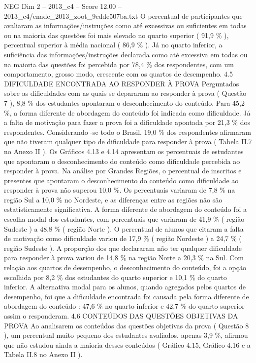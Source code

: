 \begin{textsample}{NEG Dim 2 – 2013\_c4 – Score 12.00 – 2013\_c4/enade\_2013\_zoot\_9cdde507ba.txt}
O percentual de participantes que avaliaram as informações/instruções como até excessivas ou suficientes em todas ou na maioria das questões foi mais elevado no quarto superior ( 91,9 \% ), percentual superior à média nacional ( 86,9 \% ).
Já no quarto inferior, a suficiência das informações/instruções declarada como até excessiva em todas ou na maioria das questões foi percebida por 78,4 \% dos respondentes, com um comportamento, grosso modo, crescente com os quartos de desempenho. 4.5 DIFICULDADE ENCONTRADA AO RESPONDER À PROVA Perguntados sobre as dificuldades com as quais se depararam ao responder à prova ( Questão 7 ), 8,8 \% dos estudantes apontaram o desconhecimento do conteúdo.
Para 45,2 \%, a forma diferente de abordagem do conteúdo foi indicada como dificuldade.
Já a falta de motivação para fazer a prova foi a dificuldade apontada por 21,3 \% dos respondentes.
Considerando -se todo o Brasil, 19,0 \% dos respondentes afirmaram que não tiveram qualquer tipo de dificuldade para responder à prova ( Tabela II.7 no Anexo II ).
Os Gráficos 4.13 e 4.14 apresentam os percentuais de estudantes que apontaram o desconhecimento do conteúdo como dificuldade percebida ao responder à prova.
Na análise por Grandes Regiões, o percentual de inscritos e presentes que apontaram o desconhecimento do conteúdo como dificuldade ao responder à prova não superou 10,0 \%.
Os percentuais variaram de 7,8 \% na região Sul a 10,0 \% no Nordeste, e as diferenças entre as regiões não são estatisticamente significativa.
A forma diferente de abordagem do conteúdo foi a escolha modal dos estudantes, com percentuais que variaram de 41,9 \% ( região Sudeste ) a 48,8 \% ( região Norte ).
O percentual de alunos que citaram a falta de motivação como dificuldade variou de 17,9 \% ( região Nordeste ) a 24,7 \% ( região Sudeste ).
A proporção dos que declararam não ter qualquer dificuldade para responder à prova variou de 14,8 \% na região Norte a 20,3 \% na Sul.
Com relação aos quartos de desempenho, o desconhecimento do conteúdo, foi a opção escolhida por 8,2 \% dos estudantes do quarto superior e 10,1 \% do quarto inferior.
A alternativa modal para os alunos, quando agregados pelos quartos de desempenho, foi que a dificuldade encontrada foi causada pela forma diferente de abordagem do conteúdo : 47,6 \% no quarto inferior e 42,7 \% do quarto superior assim o responderam. 4.6 CONTEÚDOS DAS QUESTÕES OBJETIVAS DA PROVA Ao analisarem os conteúdos das questões objetivas da prova ( Questão 8 ), um percentual muito pequeno dos estudantes avaliados, apenas 3,9 \%, afirmou que não estudou ainda a maioria desses conteúdos ( Gráfico 4.15, Gráfico 4.16 e a Tabela II.8 no Anexo II ).

\end{textsample}
